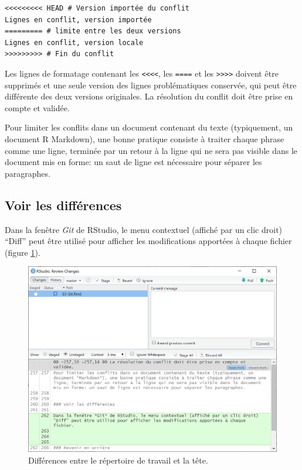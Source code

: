 \documentclass[
  12pt,
  french,
  a4paper,
  extrafontsizes,onecolumn,openright
  ]{memoir}
\begin{document}
\begin{verbatim}
<<<<<<<<< HEAD # Version importée du conflit
Lignes en conflit, version importée
========= # limite entre les deux versions
Lignes en conflit, version locale
>>>>>>>>> # Fin du conflit
\end{verbatim}

Les lignes de formatage contenant les \texttt{\textless{}\textless{}\textless{}\textless{}}, les \texttt{====} et les \texttt{\textgreater{}\textgreater{}\textgreater{}\textgreater{}} doivent être supprimés et une seule version des lignes problématiques conservée, qui peut être différente des deux versions originales.
La résolution du conflit doit être prise en compte et validée.

Pour limiter les conflits dans un document contenant du texte (typiquement, un document R Markdown), une bonne pratique consiste à traiter chaque phrase comme une ligne, terminée par un retour à la ligne qui ne sera pas visible dans le document mis en forme: un saut de ligne est nécessaire pour séparer les paragraphes.

\subsection{Voir les différences}\label{voir-les-diffuxe9rences}

Dans la fenêtre \emph{Git} de RStudio, le menu contextuel (affiché par un clic droit) \enquote{Diff} peut être utilisé pour afficher les modifications apportées à chaque fichier (figure \ref{fig:git-diff}).



\scriptsize

\begin{figure}

{\centering \includegraphics[width=0.8\linewidth]{images/git-diff} 

}

\caption{Différences entre le répertoire de travail et la tête.}\label{fig:git-diff}
\end{figure}
\end{document}
